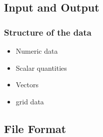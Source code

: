 \documentclass[compress]{beamer}
\begin{document}
\subsection{Input and Output}

\begin{frame}[fragile]
	\frametitle{Structure of the data}

		\begin{itemize}
		    \item Numeric data
			\item Scalar quantities
			\item Vectors
			\item grid data
		\end{itemize}
	
\end{frame}

\subsection{File Format}
\end{document}

